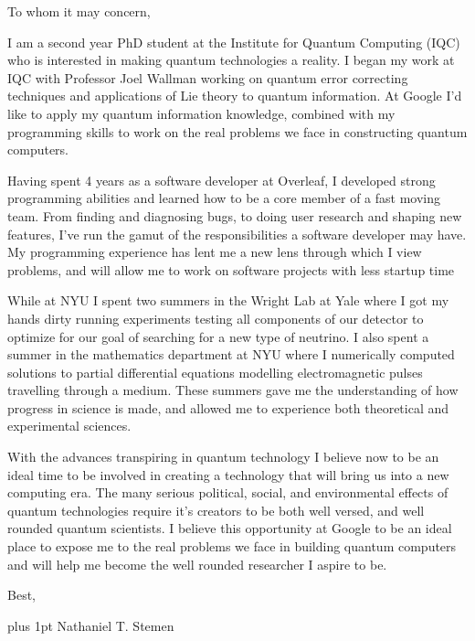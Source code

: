 \documentclass[12pt]{article}
\begin{document}
\noindent
To whom it may concern,

I am a second year PhD student at the Institute for Quantum Computing (IQC) who is interested in making quantum technologies a reality.
I began my work at IQC with Professor Joel Wallman working on quantum error correcting techniques and applications of Lie theory to quantum information.
At Google I'd like to apply my quantum information knowledge, combined with my programming skills to work on the real problems we face in constructing quantum computers.

Having spent 4 years as a software developer at Overleaf, I developed strong programming abilities and learned how to be a core member of a fast moving team.
From finding and diagnosing bugs, to doing user research and shaping new features, I've run the gamut of the responsibilities a software developer may have.
My programming experience has lent me a new lens through which I view problems, and will allow me to work on software projects with less startup time

While at NYU I spent two summers in the Wright Lab at Yale where I got my hands dirty running experiments testing all components of our detector to optimize for our goal of searching for a new type of neutrino.
I also spent a summer in the mathematics department at NYU where I numerically computed solutions to partial differential equations modelling electromagnetic pulses travelling through a medium.
These summers gave me the understanding of how progress in science is made, and allowed me to experience both theoretical and experimental sciences.

With the advances transpiring in quantum technology I believe now to be an ideal time to be involved in creating a technology that will bring us into a new computing era.
The many serious political, social, and environmental effects of quantum technologies require it's creators to be both well versed, and well rounded quantum scientists.
I believe this opportunity at Google to be an ideal place to expose me to the real problems we face in building quantum computers and will help me become the well rounded researcher I aspire to be.

\noindent
Best,

\parskip=0pt plus 1pt
Nathaniel T. Stemen
\end{document}

